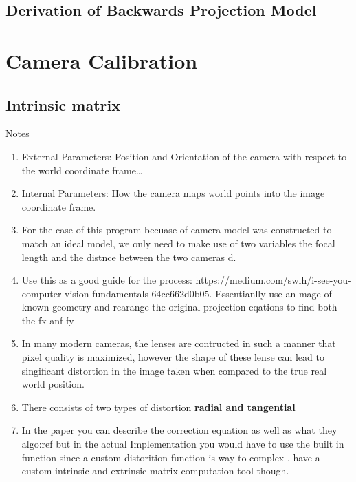 \documentclass[11pt]{scrartcl}
\begin{document}
\subsection{Derivation of Backwards Projection Model}


\section{Camera Calibration}

\subsection{Intrinsic matrix}
\begin{remark}
    Notes{\begin{enumerate}
        \item  External Parameters: Position and Orientation of the camera with respect to the world coordinate frame\dots
        \item Internal Parameters: How the camera maps world points into the image coordinate frame.
        \item For the case of this program becuase of camera model was constructed to match an ideal model, we only need to make use of two variables the focal length and the distnce between the two cameras d.
        \item Use this as a good guide for the process: https://medium.com/swlh/i-see-you-computer-vision-fundamentals-64cc662d0b05. 
            Essentianlly use an mage of known geometry and rearange the original projection eqations to find both the fx anf fy
        \item In many modern cameras, the lenses are contructed in such a manner that pixel quality is maximized, however the shape of these lense
            can lead to singificant distortion in the image taken when compared to the true real world position. 
        \item There consists of two types of distortion \textbf{radial and tangential} 
        \item In the paper you can describe the correction equation as well as what they algo:ref
            but in the actual Implementation you would have to use the built in function since a custom distorition function is way to complex
            , have a custom intrinsic and extrinsic matrix computation tool though. 
    \end{enumerate}} %
    \label{par:Notes}


\end{remark}
\end{document}
